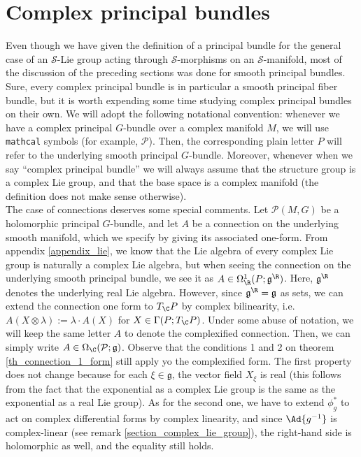 \section{Complex principal bundles} \label{sec_complex_principal_bundles}
Even though we have given the definition of a principal bundle for the general case of an \(\mathcal{S}\)-Lie group acting through \(\mathcal{S}\)-morphisms on an \(\mathcal{S}\)-manifold, most of the discussion of the preceding sections was done for smooth principal bundles. Sure, every complex principal bundle is in particular a smooth principal fiber bundle, but it is worth expending some time studying complex principal bundles on their own. We will adopt the following notational convention: whenever we have a complex principal \(G\)-bundle over a complex manifold \(M\), we will use \texttt{mathcal} symbols (for example, \(\mathcal{P}\)). Then, the corresponding plain letter \(P\) will refer to the underlying smooth principal \(G\)-bundle. Moreover, whenever when we say ``complex principal bundle'' we will always assume that the structure group is a complex Lie group, and that the base space is a complex manifold (the definition does not make sense otherwise). \\

The case of connections deserves some special comments. Let \(\mathcal{P}(M,G)\) be a holomorphic principal \(G\)-bundle, and let \(A\) be a connection on the underlying smooth manifold, which we specify by giving its associated one-form. From appendix \ref{appendix_lie}, we know that the Lie algebra of every complex Lie group is naturally a complex Lie algebra, but when seeing the connection on the underlying smooth principal bundle, we see it as \(A \in \Omega^1_\R(P;\mathfrak{g}^\R)\). Here, \(\mathfrak{g}^\R\) denotes the underlying real Lie algebra. However, since \(\mathfrak{g}^\R=\mathfrak{g}\) as sets, we can extend the connection one form to \(T_\C P\) by complex bilinearity, i.e. \(A(X \otimes \lambda):=\lambda \cdot A(X)\) for \(X \in \Gamma(P;T_\C P)\). Under some abuse of notation, we will keep the same letter \(A\) to denote the complexified connection. Then, we can simply write \(A\in \Omega_\C(\mathcal{P}; \mathfrak{g})\). Observe that the conditions 1 and 2 on theorem \ref{th_connection_1_form} still apply yo the complexified form. The first property does not change because for each \(\xi \in \mathfrak{g}\), the vector field \(X_\xi\) is real (this follows from the fact that the exponential as a complex Lie group is the same as the exponential as a real Lie group). As for the second one, we have to extend \(\phi_g^*\) to act on complex differential forms by complex linearity, and since \(\Ad{g^{-1}}\) is complex-linear (see remark \ref{section_complex_lie_group}), the right-hand side is holomorphic as well, and the equality still holds.

